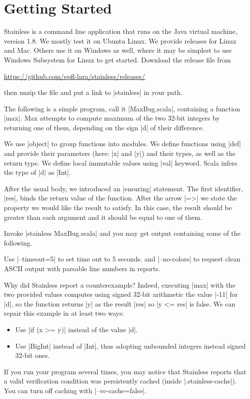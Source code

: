 \section{Getting Started}

Stainless is a command line application that runs on the Java virtual machine, version 1.8.
We mostly test it on Ubuntu Linux. We provide releases for Linux and Mac. 
Others use it on Windows as well, where it may be simplest to use Windows Subsystem for Linux
to get started. Download the release file from 
\begin{center}
\url{https://github.com/epfl-lara/stainless/releases/}
\end{center}
then unzip the file and put a link to |stainless| in your path.

The following is a simple program, call it |MaxBug.scala|, containing
a function |max|. Max attempts to compute maximum of the two 32-bit integers by
returning one of them, depending on the sign |d| of their difference.

We use |object| to group functions into modules. We define functions using |def|
and provide their parameters (here: |x| and |y|) and their types, as well as the return type.
We define local immutable values using |val| keyword. Scala infers the type of |d| as |Int|.

After the usual body, we introduced an |ensuring| statement. The first identifier, |res|,
binds the return value of the function. After the arrow |=>| we state the property we would
like the result to satisfy. In this case, the result should be greater than each argument
and it should be equal to one of them.

Invoke |stainless MaxBug.scala| and you may get output containing some of the following.

Use |--timeout=5| to set time out to 5 seconds.
and |--no-colors| to request clean ASCII output with parsable line numbers in reports.

Why did Stainless report a counterexample? Indeed, executing |max|
with the two provided values computes using signed 32-bit arithmetic the value |-11| for |d|,
so the function returns |y| as the result |res| so |y <= res| is false.
We can repair this example in at least two ways:
\begin{itemize}
\item Use |if (x >= y)| instead of the value |d|.
\item Use |BigInt| instead of |Int|, thus adopting unbounded integers instead signed 32-bit ones.
\end{itemize}
If you run your program several times, you may notice that Stainless reports that a valid verification
condition was persistently cached (inside |.stainless-cache|). You can turn off caching with |--vc-cache=false|.

